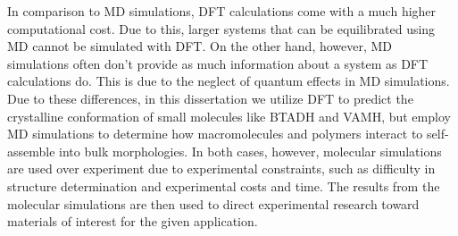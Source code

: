 In comparison to MD simulations, DFT calculations come with a much higher computational cost. Due
to this, larger systems that can be equilibrated using MD cannot be simulated with DFT. On the other
hand, however, MD simulations often don’t provide as much information about a system as DFT
calculations do. This is due to the neglect of quantum effects in MD simulations. Due to these differences, in this dissertation we utilize DFT to predict the crystalline conformation of small molecules like BTADH and VAMH, but employ MD simulations to determine how macromolecules and polymers interact to self-assemble into bulk morphologies. In both cases, however, molecular simulations are used over experiment due to experimental constraints, such as difficulty in structure determination and experimental costs and time. The results from the molecular simulations are then used to direct experimental research toward materials of interest for the given application. 
